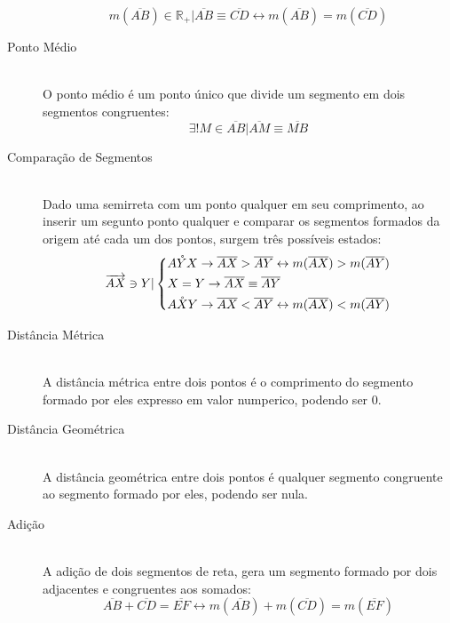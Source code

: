 \begin{description}
                \[ m(\overline{AB}) \in \mathbb{R}_{+} | \overline{AB} \equiv \overline{CD} \leftrightarrow m(\overline{AB}) = m(\overline{CD}) \]
            \item[Ponto Médio] \hfill \\
                O ponto médio é um ponto único que divide um segmento em dois segmentos congruentes:
                \[ \exists ! M \in \overline{AB} | \overline{AM} \equiv \overline{MB} \]
            \item[Comparação de Segmentos] \hfill \\
                Dado uma semirreta com um ponto qualquer em seu comprimento, ao inserir um segunto ponto qualquer e comparar os segmentos formados da origem até cada um dos pontos, surgem três possíveis estados:
                \[ \overrightarrow{AX} \ni Y | \begin{dcases} \mathring{AYX} \rightarrow \overline{AX} > \overline{AY} \leftrightarrow m(\overline{AX}) > m(\overline{AY}) \\ X = Y \rightarrow \overline{AX} \equiv \overline{AY} \\ \mathring{AXY} \rightarrow \overline{AX} < \overline{AY} \leftrightarrow m(\overline{AX}) < m(\overline{AY}) \end{dcases} \]
            \item[Distância Métrica] \hfill \\
                A distância métrica entre dois pontos é o comprimento do segmento formado por eles expresso em valor numperico, podendo ser 0.
            \item[Distância Geométrica] \hfill \\
                A distância geométrica entre dois pontos é qualquer segmento congruente ao segmento formado por eles, podendo ser nula.
            \item[Adição] \hfill \\
                A adição de dois segmentos de reta, gera um segmento formado por dois adjacentes e congruentes aos somados:
                \[ \overline{AB} + \overline{CD} = \overline{EF} \leftrightarrow m(\overline{AB}) + m(\overline{CD}) = m(\overline{EF}) \]
        \end{description}
